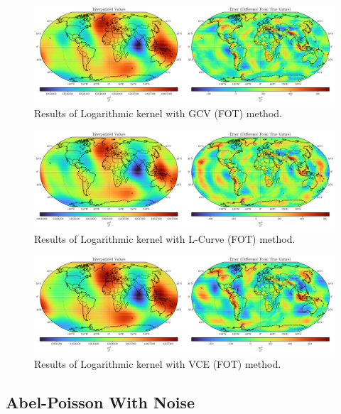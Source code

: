 \documentclass[12pt]{article}
\begin{document}
	\clearpage
	
	\begin{figure}[h!]
		\centering
		\includegraphics[width=16cm]{../Outputs/Plots/Plot_Logarithmic_GCV.pdf}
		\caption{Results of Logarithmic kernel with GCV (FOT) method.}
		\label{fig:Logarithmic_GCV}
	\end{figure}
	
	\begin{figure}[h!]
		\centering
		\includegraphics[width=16cm]{../Outputs/Plots/Plot_Logarithmic_L-Curve.pdf}
		\caption{Results of Logarithmic kernel with L-Curve (FOT) method.}
		\label{fig:Logarithmic_L-Curve}
	\end{figure}
	
	\begin{figure}[h!]
		\centering
		\includegraphics[width=16cm]{../Outputs/Plots/Plot_Logarithmic_VCE.pdf}
		\caption{Results of Logarithmic kernel with VCE (FOT) method.}
		\label{fig:Logarithmic_VCE}
	\end{figure}
	
	\subsection{Abel-Poisson With Noise}
	
\end{document}
